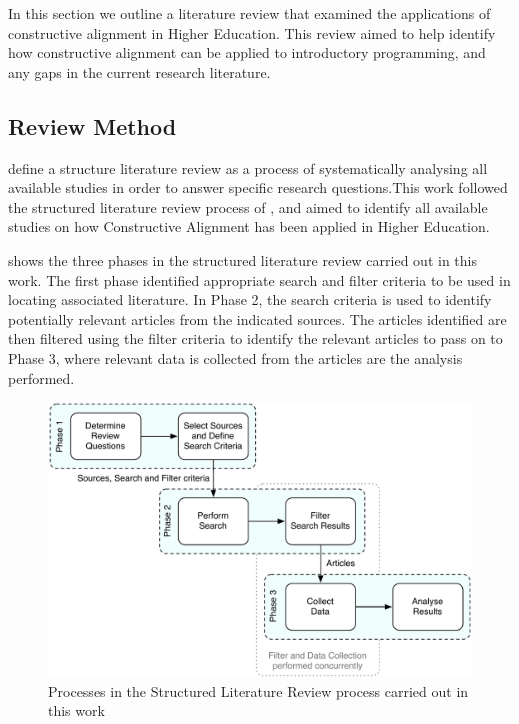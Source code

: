 In this section we outline a literature review that examined the applications of constructive alignment in Higher Education. This review aimed to help identify how constructive alignment can be applied to introductory programming, and any gaps in the current research literature. 

\subsection{Review Method} %
\label{sub:review_method}

\citet{Petticrew:2008} define a structure literature review as a process of systematically analysing all available studies in order to answer specific research questions.This work followed the structured literature review process of \citet{Kitchenham:2004}, and aimed to identify all available studies on how Constructive Alignment has been applied in Higher Education.

 shows the three phases in the structured literature review carried out in this work. The first phase identified appropriate search and filter criteria to be used in locating associated literature. In Phase 2, the search criteria is used to identify potentially relevant articles from the indicated sources. The articles identified are then filtered using the filter criteria to identify the relevant articles to pass on to Phase 3, where relevant data is collected from the articles are the analysis performed.

\begin{figure}[tbph]
	\centering
	\includegraphics[width=\textwidth]{SystematicReview}
	\caption{Processes in the Structured Literature Review process carried out in this work}
	\label{fig:struct_review_proc}
\end{figure}



